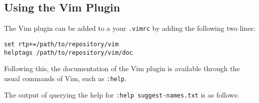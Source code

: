 \subsection{Using the Vim Plugin}
The Vim \cite{vim} plugin can be added to a your \lstinline|.vimrc| by adding
the following two lines:

\begin{lstlisting}
set rtp+=/path/to/repository/vim
helptags /path/to/repository/vim/doc
\end{lstlisting}

Following this, the documentation of the Vim plugin is available through the
usual commands of Vim, such as \lstinline|:help|.

The output of querying the help for \lstinline|:help suggest-names.txt| is as
follows:

